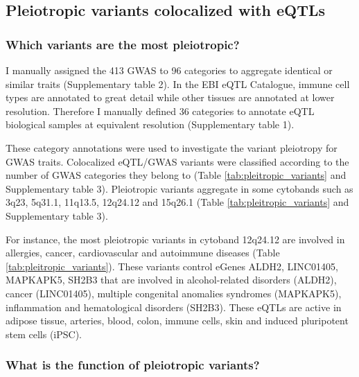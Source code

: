 \subsection*{Pleiotropic variants colocalized with eQTLs}

\subsubsection*{Which variants are the most pleiotropic?}

I manually assigned the 413 GWAS to 96 categories to aggregate identical or similar traits (Supplementary table 2).
%
In the EBI eQTL Catalogue, immune cell types are annotated to great detail while other tissues are annotated at lower resolution.
%
Therefore I manually defined 36 categories to annotate eQTL biological samples at equivalent resolution (Supplementary table 1).

These category annotations were used to investigate the variant pleiotropy for GWAS traits.
%
Colocalized eQTL/GWAS variants were classified according to the number of GWAS categories they belong to (Table \ref{tab:pleitropic_variants} and Supplementary table 3).
%
Pleiotropic variants aggregate in some cytobands such as 3q23, 5q31.1, 11q13.5, 12q24.12 and 15q26.1 (Table \ref{tab:pleitropic_variants} and Supplementary table 3).

For instance, the most pleiotropic variants in cytoband 12q24.12 are involved in allergies, cancer, cardiovascular and autoimmune diseases (Table \ref{tab:pleitropic_variants}).
%
These variants control eGenes ALDH2, LINC01405, MAPKAPK5, SH2B3 that are involved in alcohol-related disorders (ALDH2), cancer (LINC01405), multiple congenital anomalies syndromes (MAPKAPK5),  inflammation and hematological disorders (SH2B3).
%
These eQTLs are active in adipose tissue, arteries, blood, colon, immune cells, skin and induced pluripotent stem cells (iPSC).

\subsubsection*{What is the function of pleiotropic variants?}

